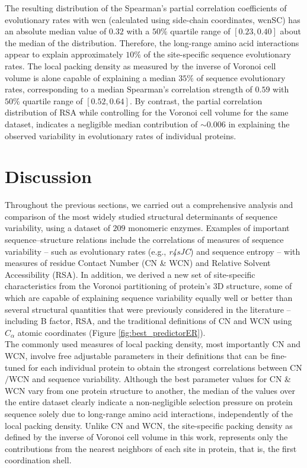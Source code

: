 \documentclass[11pt]{article}
\begin{document}
    The resulting distribution of the Spearman's partial correlation coefficients of evolutionary rates with wcn (calculated using side-chain coordinates, wcnSC) has an absolute median value of $0.32$ with a $50\%$ quartile range of $[0.23,0.40]$ about the median of the distribution. Therefore, the long-range amino acid interactions appear to explain approximately $10\%$ of the site-specific sequence evolutionary rates. The local packing density as measured by the inverse of Voronoi cell volume is alone capable of explaining a median $35\%$ of sequence evolutionary rates, corresponding to a median Spearman's correlation strength of $0.59$ with $50\%$ quartile range of $[0.52,0.64]$. By contrast, the partial correlation distribution of RSA while controlling for the Voronoi cell volume for the same dataset, indicates a negligible median contribution of $\sim0.006$ in explaining the observed variability in evolutionary rates of individual proteins.


\section{Discussion}
\label{sec:discussion}

    Throughout the previous sections, we carried out a comprehensive analysis and comparison of the most widely studied structural determinants of sequence variability, using a dataset of $209$ monomeric enzymes. Examples of important sequence--structure relations include the correlations of measures of sequence variability -- such as evolutionary rates (e.g., {\it r4sJC}) and sequence entropy -- with measures of residue Contact Number (CN \& WCN) and Relative Solvent Accessibility (RSA). In addition, we derived a new set of site-specific characteristics from the Voronoi partitioning of protein's 3D structure, some of which are capable of explaining sequence variability equally well or better than several structural quantities that were previously considered in the literature -- including B factor, RSA, and the traditional definitions of CN and WCN using $C_\alpha$ atomic coordinates (Figure \ref{fig:best_predictorER}). \\

    The commonly used measures of local packing density, most importantly CN and WCN, involve free adjustable parameters in their definitions that can be fine-tuned for each individual protein to obtain the strongest correlations between CN$/$WCN and sequence variability.   Although the best parameter values for CN \& WCN vary from one protein structure to another, the median of the values over the entire dataset clearly indicate a non-negligible selection pressure on protein sequence solely due to long-range amino acid interactions, independently of the local packing density. Unlike CN and WCN, the site-specific packing density as defined by the inverse of Voronoi cell volume in this work, represents only the contributions from the nearest neighbors of each site in protein, that is, the first coordination shell.  \\
\end{document}
